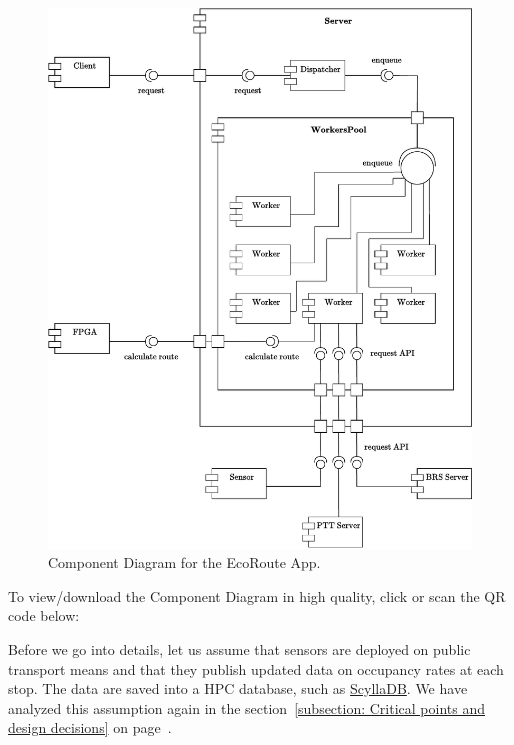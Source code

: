 \documentclass[a4paper]{article}
\begin{document}
    \begin{figure}[!htp]
        \centering
        \includegraphics[width=\textwidth]{img/component-diagram.pdf}
        \caption{Component Diagram for the EcoRoute App.}
        \label{fig: component diagram}
    \end{figure}

    \hfill
    
    \newpage

    \noindent
    To view/download the Component Diagram in high quality, click or scan the QR code below:
    \begin{center}
    \end{center}

    \noindent
    Before we go into details, let us assume that sensors are deployed on public transport means and that they publish updated data on occupancy rates at each stop. The data are saved into a HPC database, such as \href{https://www.scylladb.com/}{ScyllaDB}. We have analyzed this assumption again in the section~\ref{subsection: Critical points and design decisions} on page~\pageref{subsection: Critical points and design decisions}.
\end{document}
